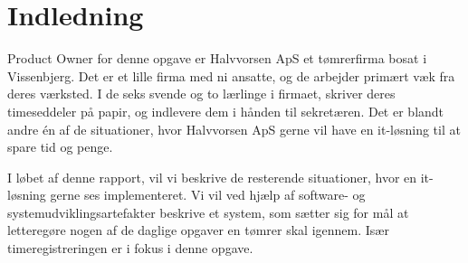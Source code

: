 \section{Indledning}
Product Owner for denne opgave er Halvvorsen ApS et tømrerfirma bosat i Vissenbjerg.
Det er et lille firma med ni ansatte, og de arbejder primært væk fra deres værksted.
I de seks svende og to lærlinge i firmaet, skriver deres timeseddeler på papir, og indlevere dem i hånden til sekretæren. 
Det er blandt andre én af de situationer, hvor Halvvorsen ApS gerne vil have en it-løsning til at spare tid og penge.

I løbet af denne rapport, vil vi beskrive de resterende situationer, hvor en it-løsning gerne ses implementeret.
Vi vil ved hjælp af software- og systemudviklingsartefakter beskrive et system, som sætter sig for mål at letteregøre nogen af de daglige opgaver en tømrer skal igennem. Især timeregistreringen er i fokus i denne opgave. 